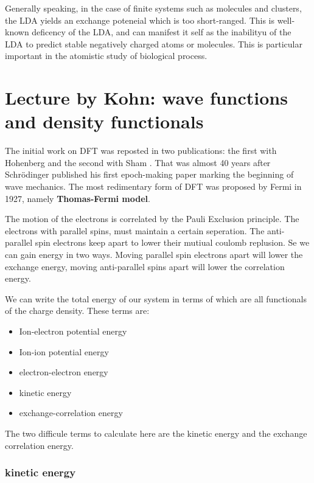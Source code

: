 \documentclass[a4paper, 11pt]{article}
\numberwithin{equation}{subsection}
\begin{document}
Generally speaking, in the case of finite systems such as molecules and clusters, the LDA yields an exchange poteneial which is too short-ranged. This is well-known deficency of the LDA, and can manifest it self as the inabilityu of the LDA to predict stable negatively charged atoms or molecules. This is particular important in the atomistic study of biological process.


\section{Lecture by Kohn: wave functions and density functionals}

The initial work on DFT was reposted in two publications: the first with Hohenberg \cite{hohenberg_inhomogeneous_1964} and the second with Sham \cite{kohn_self-consistent_1965}. That was almost 40 years after Schr{\"o}dinger published his first epoch-making paper marking the beginning of wave mechanics. The most redimentary form of DFT was proposed by Fermi in 1927, namely \textbf{Thomas-Fermi model}. 


The motion of the electrons is correlated by the Pauli Exclusion principle. The electrons with parallel spins, must maintain a certain seperation. The anti-parallel spin electrons keep apart to lower their mutiual coulomb replusion. Se we can gain energy in two ways. Moving parallel spin electrons apart will lower the exchange energy, moving anti-parallel spins apart will lower the correlation energy.

We can write the total energy of our system in terms of which are all functionals of the charge density. These terms are:

\begin{itemize}
  \item Ion-electron potential energy
  \item Ion-ion potential energy
  \item electron-electron energy
  \item kinetic energy
  \item exchange-correlation energy
\end{itemize}

The two difficule terms to calculate here are the kinetic energy and the exchange correlation energy.

\subsubsection{kinetic energy}
\end{document}
